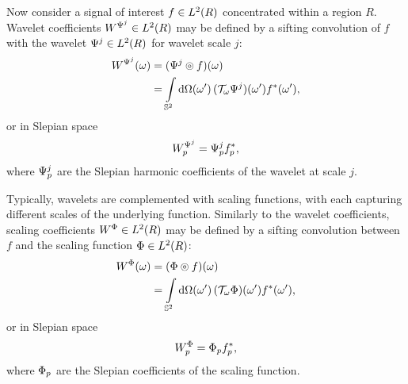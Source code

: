Now consider a signal of interest \(f \in \hilbert{R}\) concentrated within a region \(R\).
Wavelet coefficients \(W^{\Psi^{j}} \in \hilbert{R}\) may be defined by a sifting convolution of \(f\) with the wavelet \(\Psi^{j} \in \hilbert{R}\) for wavelet scale \(j\):
%
\begin{align}\label{eq:chapter4_slepian_wavelet_omega}
	\pixel{W^{\Psi^{j}}}
	 & = \pixel{\convolution{\Psi^{j}}{f}} \nonumber                                              \\
	 & = \integrateSphere{\omega'} \pixel[']{(\translation{\omega}\Psi^{j})} \pixel[']{\conj{f}},
\end{align}
%
or in Slepian space
%
\begin{equation}\label{eq:chapter4_slepian_wavelet_p}
	\slepian{W}^{\Psi^{j}}
	= \slepian{\Psi}^{j} \conj{\slepian{f}},
\end{equation}
%
where \(\slepian{\Psi}^{j}\) are the Slepian harmonic coefficients of the wavelet at scale \(j\).

Typically, wavelets are complemented with scaling functions, with each capturing different scales of the underlying function.
Similarly to the wavelet coefficients, scaling coefficients \(W^{\Phi} \in \hilbert{R}\) may be defined by a sifting convolution between \(f\) and the scaling function \(\Phi \in \hilbert{R}\):
%
\begin{align}\label{eq:chapter4_slepian_scaling_omega}
	\pixel{W^{\Phi}}
	 & = \pixel{\convolution{\Phi}{f}} \nonumber                                              \\
	 & = \integrateSphere{\omega'} \pixel[']{(\translation{\omega}\Phi)} \pixel[']{\conj{f}},
\end{align}
%
or in Slepian space
%
\begin{equation}\label{eq:chapter4_slepian_scaling_p}
	\slepian{W}^{\Phi}
	= \slepian{\Phi} \conj{\slepian{f}},
\end{equation}
%
where \(\slepian{\Phi}\) are the Slepian coefficients of the scaling function.

